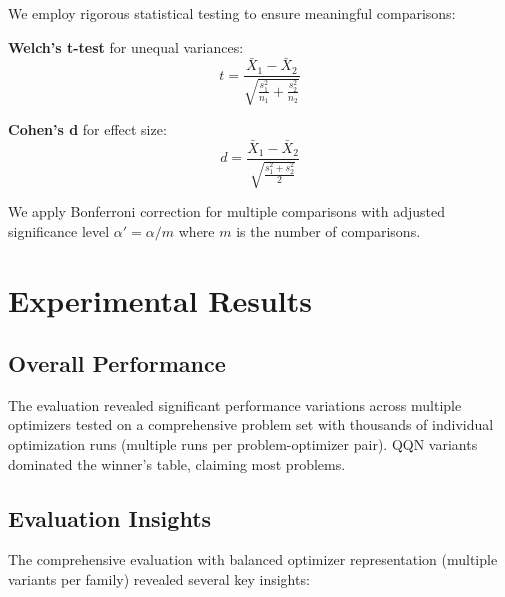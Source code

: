 We employ rigorous statistical testing to ensure meaningful comparisons:

\textbf{Welch's t-test} for unequal variances:
\[t = \frac{\bar{X}_1 - \bar{X}_2}{\sqrt{\frac{s_1^2}{n_1} + \frac{s_2^2}{n_2}}}\]

\textbf{Cohen's d} for effect size:
\[d = \frac{\bar{X}_1 - \bar{X}_2}{\sqrt{\frac{s_1^2 + s_2^2}{2}}}\]

We apply Bonferroni correction for multiple comparisons with adjusted significance level \(\alpha' = \alpha / m\) where \(m\) is the number of comparisons.

\hypertarget{experimental-results}{%
\section{Experimental Results}\label{experimental-results}}

\hypertarget{overall-performance}{%
\subsection{Overall Performance}\label{overall-performance}}

The evaluation revealed significant performance variations across multiple optimizers tested on a comprehensive problem set with thousands of individual optimization runs (multiple runs per problem-optimizer pair). QQN variants dominated the winner's table, claiming most problems.

\hypertarget{evaluation-insights}{%
\subsection{Evaluation Insights}\label{evaluation-insights}}

The comprehensive evaluation with balanced optimizer representation (multiple variants per family) revealed several key insights:


